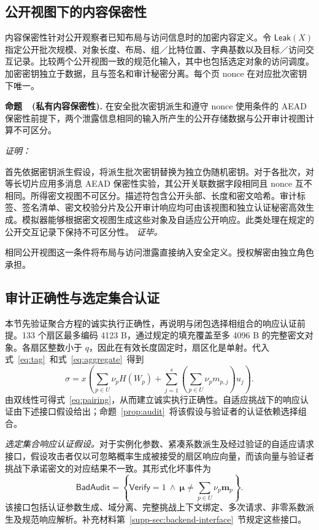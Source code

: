 \documentclass[10pt,journal]{IEEEtran}
\newcounter{proposition}
\newenvironment{proposition}[1]{%
  \refstepcounter{proposition}\par\smallskip\noindent
  \textbf{命题~\theproposition\ (#1). }\ignorespaces
}{\par\smallskip}
\newenvironment{claimproof}{\par\noindent\emph{证明：}\ignorespaces
}{\hfill\textit{证毕。}\par\smallskip}
\begin{document}
\subsection{公开视图下的内容保密性}\label{sec:confidentiality}
内容保密性针对公开观察者已知布局与访问信息时的加密内容定义。令 $\mathsf{Leak}(X)$ 指定公开批次规模、对象长度、布局、组／比特位置、字典基数以及目标／访问交互记录。比较两个公开视图一致的规范化输入，其中也包括选定对象的访问调度。加密密钥独立于数据，且与签名和审计秘密分离。每个页 nonce 在对应批次密钥下唯一。

\begin{proposition}{私有内容保密性}\label{prop:confidentiality}
在安全批次密钥派生和遵守 nonce 使用条件的 AEAD 保密性前提下，两个泄露信息相同的输入所产生的公开存储数据与公开审计视图计算不可区分。
\end{proposition}
\begin{claimproof}
首先依据密钥派生假设，将派生批次密钥替换为独立伪随机密钥。对于各批次，对等长切片应用多消息 AEAD 保密性实验，其公开关联数据字段相同且 nonce 互不相同。所得密文视图不可区分。描述符包含公开头部、长度和密文哈希。审计标签、签名清单、密文校验分片及公开审计响应均可由该视图和独立认证秘密高效生成。模拟器能够根据密文视图生成这些对象及自适应公开响应。此类处理在规定的公开交互记录下保持不可区分性。
\end{claimproof}
相同公开视图这一条件将布局与访问泄露直接纳入安全定义。授权解密由独立角色承担。

\subsection{审计正确性与选定集合认证}\label{sec:audit-scope}
本节先验证聚合方程的诚实执行正确性，再说明与闭包选择相组合的响应认证前提。133 个扇区最多编码 4123 B，通过规定的填充覆盖至多 4096 B 的完整密文对象。各扇区整数小于 $q$，因此在有效长度固定时，扇区化是单射。代入式~\eqref{eq:tag}~和式~\eqref{eq:aggregate}~得到
\begin{equation}\label{eq:honest}
\sigma=x\left(\sum_{p\in U}\nu_pH(W_p)+
\sum_{j=1}^{s}\left(\sum_{p\in U}\nu_pm_{p,j}\right)u_j\right).
\end{equation}
由双线性可得式~\eqref{eq:pairing}，从而建立诚实执行正确性。自适应挑战下的响应认证由下述接口假设给出；命题~\ref{prop:audit}~将该假设与验证者的认证依赖选择组合。

\emph{选定集合响应认证假设。}对于实例化参数、紧凑系数派生及经过验证的自适应请求接口，假设攻击者仅以可忽略概率生成被接受的扇区响应向量，而该向量与验证者挑战下承诺密文的对应结果不一致。其形式化坏事件为
\begin{equation}\label{eq:bad-audit}
\mathsf{BadAudit}=\left\{\mathsf{Verify}=1\ \land\
\boldsymbol\mu\neq\sum_{p\in U}\nu_p\mathbf m_p\right\}.
\end{equation}
该接口包括认证参数生成、域分离、完整挑战上下文绑定、多次请求、非零系数派生及规范响应解析。补充材料第~\ref*{supp-sec:backend-interface}~节规定这些接口。
\end{document}
